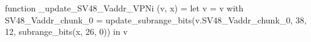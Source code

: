 function _update_SV48_Vaddr_VPNi (v, x) = let v = { v with SV48_Vaddr_chunk_0 = update_subrange_bits(v.SV48_Vaddr_chunk_0, 38, 12, subrange_bits(x, 26, 0)) } in
  v

